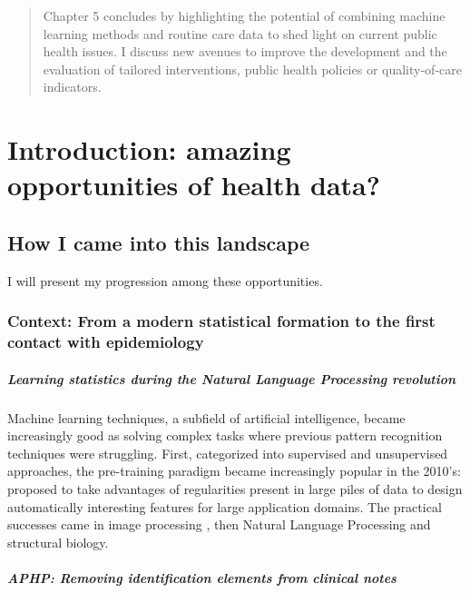 \documentclass{report}
\begin{document}
\begin{abstract}
  Chapter 5 concludes by highlighting the potential of combining machine
  learning methods and routine care data to shed light on current public health
  issues. I discuss new avenues to improve the development and the evaluation of
  tailored interventions, public health policies or quality-of-care indicators.

\end{abstract}

\tableofcontents




\chapter{Introduction: amazing opportunities of health data?}\label{chap:intro}
\section{How I came into this landscape}\label{sec:intro:landscape}

I will present my progression among these opportunities.

\subsection{Context: From a modern statistical formation to the first contact with epidemiology}\label{subsec:intro:context}

\paragraph{Learning statistics during the Natural Language Processing revolution}

Machine learning techniques, a subfield of artificial intelligence, became
increasingly good as solving complex tasks where previous pattern recognition
techniques were struggling. First, categorized into supervised and unsupervised
approaches, the pre-training paradigm became increasingly popular in the 2010's:
\cite{halevy2009unreasonable} proposed to take advantages of regularities
present in large piles of data to design automatically interesting features for
large application domains. The practical successes came in image processing
\citep{}, then Natural Language Processing \citep{} and structural biology.
%

\paragraph{APHP: Removing identification elements from clinical notes}
\end{document}
